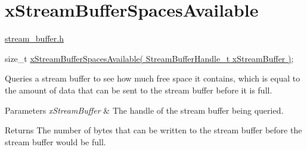 \hypertarget{group__x_stream_buffer_spaces_available}{}\section{x\+Stream\+Buffer\+Spaces\+Available}
\label{group__x_stream_buffer_spaces_available}
\hyperlink{stream__buffer_8h}{stream\+\_\+buffer.\+h}


\begin{DoxyPre}
size\_t \hyperlink{stream__buffer_8h_a9a78e0206cb1dc343c329f9db579208d}{xStreamBufferSpacesAvailable( StreamBufferHandle\_t xStreamBuffer )};
\end{DoxyPre}


Queries a stream buffer to see how much free space it contains, which is equal to the amount of data that can be sent to the stream buffer before it is full.


\begin{DoxyParams}{Parameters}
{\em x\+Stream\+Buffer} & The handle of the stream buffer being queried.\\
\hline
\end{DoxyParams}
\begin{DoxyReturn}{Returns}
The number of bytes that can be written to the stream buffer before the stream buffer would be full. 
\end{DoxyReturn}
